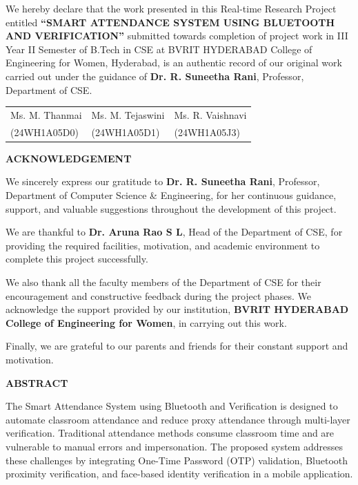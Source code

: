 \documentclass[12pt,a4paper]{report}
\begin{document}
We hereby declare that the work presented in this Real-time Research Project entitled \textbf{``SMART ATTENDANCE SYSTEM USING BLUETOOTH AND VERIFICATION''} submitted towards completion of project work in III Year II Semester of B.Tech in CSE at BVRIT HYDERABAD College of Engineering for Women, Hyderabad, is an authentic record of our original work carried out under the guidance of \textbf{Dr. R. Suneetha Rani}, Professor, Department of CSE.

\vspace{2.0cm}
\begin{tabular}{p{}p{}p{}}
\centering Ms. M. Thanmai & \centering Ms. M. Tejaswini & \centering Ms. R. Vaishnavi \\
\centering (24WH1A05D0) & \centering (24WH1A05D1) & \centering (24WH1A05J3) \\
\end{tabular}

\clearpage
{}
\setcounter{page}{1}
\begin{center}
{\Large \textbf{ACKNOWLEDGEMENT}}
\end{center}

We sincerely express our gratitude to \textbf{Dr. R. Suneetha Rani}, Professor, Department of Computer Science \& Engineering, for her continuous guidance, support, and valuable suggestions throughout the development of this project.

We are thankful to \textbf{Dr. Aruna Rao S L}, Head of the Department of CSE, for providing the required facilities, motivation, and academic environment to complete this project successfully.

We also thank all the faculty members of the Department of CSE for their encouragement and constructive feedback during the project phases. We acknowledge the support provided by our institution, \textbf{BVRIT HYDERABAD College of Engineering for Women}, in carrying out this work.

Finally, we are grateful to our parents and friends for their constant support and motivation.

\clearpage
\begin{center}
{\Large \textbf{ABSTRACT}}
\end{center}

The Smart Attendance System using Bluetooth and Verification is designed to automate classroom attendance and reduce proxy attendance through multi-layer verification. Traditional attendance methods consume classroom time and are vulnerable to manual errors and impersonation. The proposed system addresses these challenges by integrating One-Time Password (OTP) validation, Bluetooth proximity verification, and face-based identity verification in a mobile application.
\end{document}
